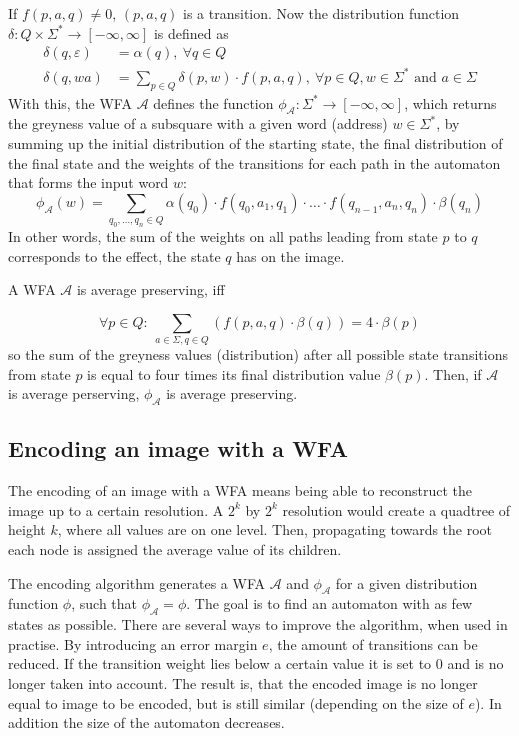 \documentclass{article}
\begin{document}
If $f(p,a,q) \neq 0$, $(p,a,q)$ is a transition.
Now the distribution function $\delta: Q \times \Sigma^* \rightarrow [-\infty, \infty]$ is defined as 
\begin{align*}
\delta(q,\varepsilon) &= \alpha(q),\ \forall q\in Q \\
\delta(q,wa)&= \sum_{p\in Q} \delta(p,w) \cdot f(p,a,q),\ \forall p\in Q, w\in \Sigma^* \text{ and }a\in \Sigma
\end{align*}
With this, the WFA $\mathcal{A}$ defines the function $\phi_{\mathcal{A}}:\Sigma^* \rightarrow [-\infty, \infty]$, which returns the greyness value of a subsquare with a given word (address) $w \in \Sigma^*$, by summing up the initial distribution of the starting state, the final distribution of the final state and the weights of the transitions for each path in the automaton that forms the input word $w$:
$$\phi_{\mathcal{A}}(w) = \sum_{q_0,\dots,q_n \in Q} \alpha(q_0) \cdot f(q_0,a_1,q_1) \cdot \dots \cdot f(q_{n-1}, a_n, q_n ) \cdot \beta(q_n)$$
In other words, the sum of the weights on all paths leading from state $p$ to $q$ corresponds to the effect, the state $q$ has on the image.

A WFA $\mathcal{A}$ is average preserving, iff 

$$\forall p \in Q:\ \sum_{a\in \Sigma, q\in Q} (f(p,a,q) \cdot \beta(q)) = 4 \cdot \beta(p)$$
so the sum of the greyness values (distribution) after all possible state transitions from state $p$ is equal to four times its final distribution value $\beta(p)$. Then, if $\mathcal{A}$ is average perserving, $\phi_{\mathcal A}$ is average preserving.

\subsection{Encoding an image with a WFA}
The encoding of an image with a WFA means being able to reconstruct the image up to a certain resolution. A $2^k$ by $2^k$ resolution would create a quadtree of height $k$, where all values are on one level. Then, propagating towards the root each node is assigned the average value of its children.

The encoding algorithm generates a WFA $\mathcal A$ and $\phi_\mathcal A$ for a given distribution function $\phi$, such that $\phi_\mathcal A = \phi$. The goal is to find an automaton with as few states as possible. There are several ways to improve the algorithm, when used in practise. By introducing an error margin $e$, the amount of transitions can be reduced. If the transition weight lies below a certain value it is set to 0 and is no longer taken into account. The result is, that the encoded image is no longer equal to image to be encoded, but is still similar (depending on the size of $e$). In addition the size of the automaton decreases.
\end{document}
